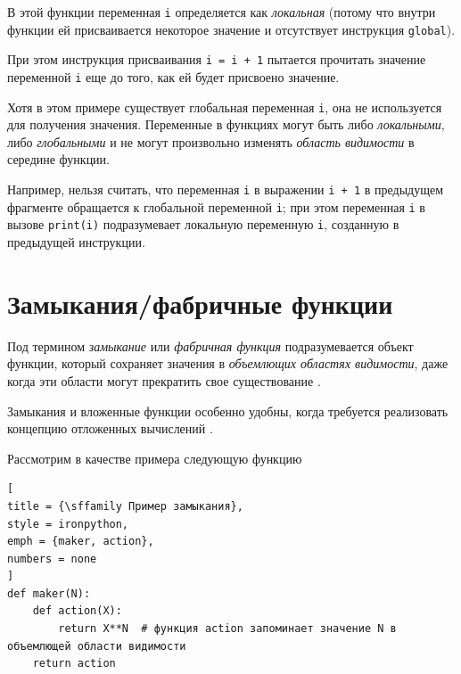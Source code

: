 \documentclass[%
	11pt,
	a4paper,
	utf8,
		]{article}
\begin{document}
В этой функции переменная \texttt{i} определяется как \emph{локальная} (потому что внутри функции ей присваивается некоторое значение и отсутствует инструкция \texttt{global}).

При этом инструкция присваивания \lstinline{i = i + 1} пытается прочитать значение переменной \texttt{i} еще до того, как ей будет присвоено значение.

Хотя в этом примере существует глобальная переменная \texttt{i}, она не используется для получения значения. Переменные в функциях могут быть либо \emph{локальными}, либо \emph{глобальными} и не могут произвольно изменять \emph{область видимости} в середине функции.

Например, нельзя считать, что переменная \texttt{i} в выражении \lstinline{i + 1} в предыдущем фрагменте обращается к глобальной переменной \texttt{i}; при этом переменная \texttt{i} в вызове \texttt{print(i)} подразумевает локальную переменную \texttt{i}, созданную в предыдущей инструкции.


\section{Замыкания/фабричные функции}

Под термином \emph{замыкание} или \emph{фабричная функция} подразумевается объект функции, который сохраняет значения в \emph{объемлющих областях видимости}, даже когда эти области могут прекратить свое существование \cite[стр.~488]{lutz:learningpython-2011}.

Замыкания и вложенные функции особенно удобны, когда требуется реализовать концепцию отложенных вычислений \cite{beazley:python-2010}.

Рассмотрим в качестве примера следующую функцию

\begin{lstlisting}[
title = {\sffamily Пример замыкания},
style = ironpython,
emph = {maker, action},
numbers = none
]
def maker(N):
    def action(X):
        return X**N  # функция action запоминает значение N в объемлющей области видимости
    return action
\end{lstlisting}
\end{document}
